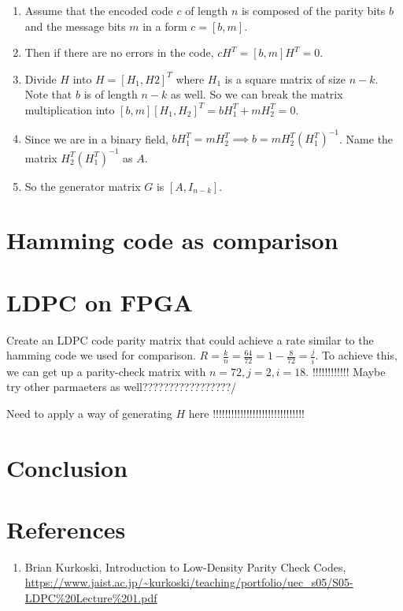 \documentclass[letterpaper,12pt,oneside]{article}
\begin{document}
\begin{enumerate}
    \item Assume that the encoded code $c$ of length $n$ is composed of the parity bits $b$ and the message bits $m$ in a form $c = [b, m]$.
    \item Then if there are no errors in the code, $cH^T = [b, m]H^T = 0$.
    \item Divide $H$ into $H = [H_1, H2]^T$ where $H_1$ is a square matrix of size $n-k$. Note that $b$ is of length $n-k$ as well. So we can break the matrix multiplication into $[b, m][H_1, H_2]^T = bH_1^T + mH_2^T = 0$.
    \item Since we are in a binary field, $bH_1^T = mH_2^T \implies b = mH_2^T(H_1^T)^{-1}$. Name the matrix $H_2^T(H_1^T)^{-1}$ as $A$.
    \item So the generator matrix $G$ is $[A, I_{n-k}]$.
\end{enumerate}

\section{Hamming code as comparison}
\section{LDPC on FPGA}
Create an LDPC code parity matrix that could achieve a rate similar to the hamming code we used for comparison. $R=\frac{k}{n}=\frac{64}{72}=1-\frac{8}{72} = \frac{j}{i}$. To achieve this, we can get up a parity-check matrix with $n=72, j=2, i=18$.  !!!!!!!!!!!! Maybe try other parmaeters as well?????????????????/

Need to apply a way of generating $H$ here !!!!!!!!!!!!!!!!!!!!!!!!!!!!!!
\section{Conclusion}
\section{References}
\begin{enumerate}
    \item \label{[1]} Brian Kurkoski, Introduction to Low-Density Parity Check Codes, \url{https://www.jaist.ac.jp/~kurkoski/teaching/portfolio/uec_s05/S05-LDPC%20Lecture%201.pdf}
\end{enumerate}
\end{document}
